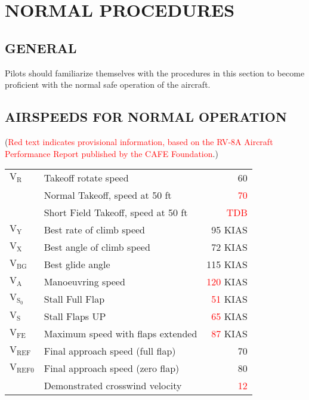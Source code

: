 \chapter{NORMAL PROCEDURES}
\vspace{\minitocspacebefore}
\minitoc
\cleardoublepage

\section{GENERAL}

Pilots should familiarize themselves with the procedures in this section
to become proficient with the normal safe operation of the aircraft.

\section{AIRSPEEDS FOR NORMAL OPERATION}
(\textcolor{red}{Red text indicates provisional information, based
on the RV-8A Aircraft Performance Report published by the CAFE Foundation}.)

\begin{center}\begin{tabular}{llr}
$\mathrm{V_{R}}$&
Takeoff rotate speed&
60\tabularnewline
&
Normal Takeoff, speed at 50 ft &
\textcolor{red}{70}\tabularnewline
&
Short Field Takeoff, speed at 50 ft&
\textcolor{red}{TDB}\tabularnewline
$\mathrm{V_{Y}}$ &
Best rate of climb speed&
95 KIAS\tabularnewline
$\mathrm{V_{X}}$ &
Best angle of climb speed&
72 KIAS\tabularnewline
$\mathrm{V_{BG}}$&
Best glide angle&
115 KIAS\tabularnewline
$\mathrm{V_{A}}$ &
Manoeuvring speed&
\textcolor{red}{120} KIAS\tabularnewline
$\mathrm{V_{S_{0}}}$ &
Stall Full Flap&
\textcolor{red}{51} KIAS\tabularnewline
$\mathrm{V_{S}}$ &
Stall Flaps UP&
\textcolor{red}{65} KIAS\tabularnewline
$\mathrm{V_{FE}}$ &
Maximum speed with flaps extended &
\textcolor{red}{87} KIAS\tabularnewline
$\mathrm{V_{REF}}$ &
Final approach speed (full flap)&
70\tabularnewline
$\mathrm{V_{REF0}}$ &
Final approach speed (zero flap)&
80\tabularnewline
&
Demonstrated crosswind velocity&
\textcolor{red}{12}\tabularnewline
\end{tabular}\end{center}

%

